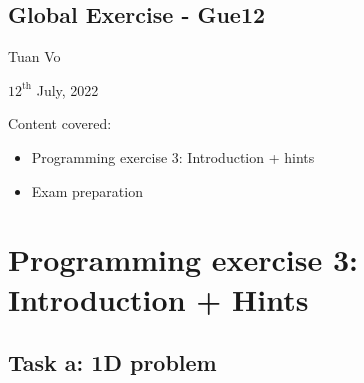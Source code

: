 \documentclass[12pt]{article}
\begin{document}
\begin{center}
	\section*{Global Exercise - Gue12}
\end{center}
\begin{center}
	Tuan Vo
\end{center}
\begin{center}
	$12^{\text{th}}$ July, 2022
\end{center}
Content covered:
\begin{itemize}
	\item[\checkmark] Programming exercise 3: Introduction + hints
	\item[\checkmark] Exam preparation
\end{itemize}

\section{Programming exercise 3: Introduction + Hints}
\subsection{Task a: 1D problem}
\end{document}
